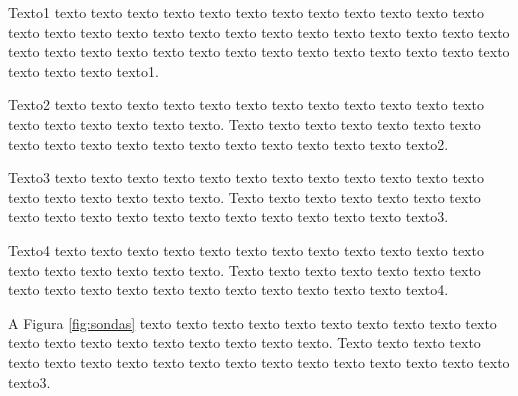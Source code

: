  	\begin{figure}[h!] 
   	    \captionsetup{width=16cm}%
	\end{figure}
	
    Texto1 texto texto texto texto texto texto texto texto texto texto texto texto texto texto texto texto texto texto texto texto texto texto texto texto texto texto texto texto texto texto texto texto texto texto texto texto texto texto texto texto texto texto texto texto1.

    Texto2 texto texto texto texto texto texto texto texto texto texto texto texto texto texto texto texto texto texto. Texto texto texto texto texto texto texto texto texto texto texto texto texto texto texto texto texto texto texto2.

    Texto3 texto texto texto texto texto texto texto texto texto texto texto texto texto texto texto texto texto texto. Texto texto texto texto texto texto texto texto texto texto texto texto texto texto texto texto texto texto texto3.

    Texto4 texto texto texto texto texto texto texto texto texto texto texto texto texto texto texto texto texto texto. Texto texto texto texto texto texto texto texto texto texto texto texto texto texto texto texto texto texto texto4.

    A Figura \ref{fig:sondas} texto texto texto texto texto texto texto texto texto texto texto texto texto texto texto texto texto texto texto. Texto texto texto texto texto texto texto texto texto texto texto texto texto texto texto texto texto texto texto3.

